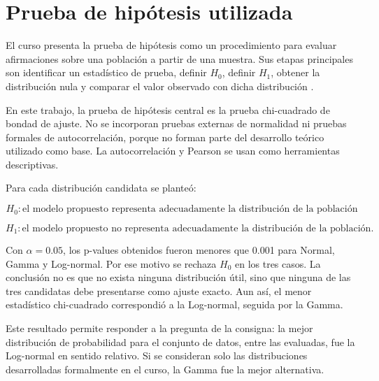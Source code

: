 \section{Prueba de hipótesis utilizada}

El curso presenta la prueba de hipótesis como un procedimiento para evaluar afirmaciones sobre una población a partir de una muestra. Sus etapas principales son identificar un estadístico de prueba, definir \(H_0\), definir \(H_1\), obtener la distribución nula y comparar el valor observado con dicha distribución \cite{curso_hipotesis}.

En este trabajo, la prueba de hipótesis central es la prueba chi-cuadrado de bondad de ajuste. No se incorporan pruebas externas de normalidad ni pruebas formales de autocorrelación, porque no forman parte del desarrollo teórico utilizado como base. La autocorrelación y Pearson se usan como herramientas descriptivas.

Para cada distribución candidata se planteó:

\[
H_0: \text{el modelo propuesto representa adecuadamente la distribución de la población}
\]

\[
H_1: \text{el modelo propuesto no representa adecuadamente la distribución de la población}.
\]

Con \(\alpha=0.05\), los p-values obtenidos fueron menores que 0.001 para Normal, Gamma y Log-normal. Por ese motivo se rechaza \(H_0\) en los tres casos. La conclusión no es que no exista ninguna distribución útil, sino que ninguna de las tres candidatas debe presentarse como ajuste exacto. Aun así, el menor estadístico chi-cuadrado correspondió a la Log-normal, seguida por la Gamma.

Este resultado permite responder a la pregunta de la consigna: la mejor distribución de probabilidad para el conjunto de datos, entre las evaluadas, fue la Log-normal en sentido relativo. Si se consideran solo las distribuciones desarrolladas formalmente en el curso, la Gamma fue la mejor alternativa.

